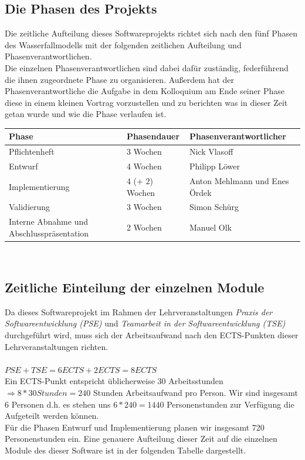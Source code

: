 \documentclass[10pt,a4paper]{article}
\begin{document}
\subsection{Die Phasen des Projekts}
Die zeitliche Aufteilung dieses Softwareprojekts richtet sich nach den fünf Phasen des Wasserfallmodells mit der folgenden zeitlichen Aufteilung und Phasenverantwortlichen.\\
Die einzelnen Phasenverantwortlichen sind dabei dafür zuständig, federführend die ihnen zugeordnete Phase zu organisieren. Außerdem hat der Phasenverantwortliche die Aufgabe in dem Kolloquium am Ende seiner Phase diese in einem kleinen Vortrag vorzustellen und zu berichten was in dieser Zeit getan wurde und wie die Phase verlaufen ist.\\

\begin{tabular}[h]{lll}
	\hline
	\textbf{Phase} & \textbf{Phasendauer} & \textbf{Phasenverantwortlicher} \\
	\hline
	Pflichtenheft & 3 Wochen & Nick Vlasoff \\
	Entwurf & 4 Wochen & Philipp Löwer \\
	Implementierung & 4 (+ 2) Wochen & Anton Mehlmann und Enes Ördek \\
	Validierung & 3 Wochen & Simon Schürg \\
	Interne Abnahme und Abschlusspräsentation & 2 Wochen & Manuel Olk \\
	\hline
\end{tabular}
\\

\subsection{Zeitliche Einteilung der einzelnen Module}
Da dieses Softwareprojekt im Rahmen der Lehrveranstaltungen \textit{Praxis der Softwareentwicklung (PSE)} und \textit{Teamarbeit in der Softwareentwicklung (TSE)} durchgeführt wird, muss sich der Arbeitsaufwand nach den ECTS-Punkten dieser Lehrveranstaltungen richten.\\\\
$PSE + TSE = 6 ECTS + 2 ECTS = 8 ECTS$\\
Ein ECTS-Punkt entspricht üblicherweise 30 Arbeitsstunden $\Rightarrow 8 * 30 Stunden = 240$ Stunden Arbeitsaufwand pro Person. Wir sind insgesamt 6 Personen d.h. es stehen uns $6 * 240 = 1440$ Personenstunden zur Verfügung die Aufgeteilt werden können.\\
Für die Phasen Entwurf und Implementierung planen wir insgesamt 720 Personenstunden ein. Eine genauere Aufteilung dieser Zeit auf die einzelnen Module des dieser Software ist in der folgenden Tabelle dargestellt.\\
\end{document}
